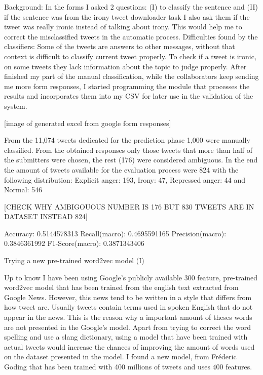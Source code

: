 Background: In the forms I asked 2 questions: (I) to classify the sentence and (II) if the sentence was from the irony tweet downloader task I also ask them if the tweet was really ironic instead of talking about irony. This would help me to correct the misclassified tweets in the automatic process.
Difficulties found by the classifiers:  
Some of the tweets are answers to other messages, without that context is difficult to classify current tweet properly.
To check if a tweet is ironic, on some tweets they lack information about the topic to judge properly.
After finished my part of the manual classification, while the collaborators keep sending me more form responses, I started programming the module that processes the results and incorporates them into my CSV for later use in the validation of the system.

[image of generated excel from google form responses]

From the 11,074 tweets dedicated for the prediction phase 1,000 were manually classified. From the obtained responses only those tweets that more than half of the submitters were chosen, the rest (176) were considered ambiguous.
In the end the amount of tweets available for the evaluation process were 824 with the following distribution:
Explicit anger: 193, Irony: 47, Repressed anger: 44 and Normal: 546

[CHECK WHY AMBIGOUOUS NUMBER IS 176 BUT 830 TWEETS ARE IN DATASET INSTEAD 824]

Accuracy: 0.5144578313
Recall(macro): 0.4695591165
Precision(macro): 0.3846361992
F1-Score(macro): 0.3871343406

Trying a new pre-trained word2vec model (I)

Up to know I have been using Google’s publicly available 300 feature, pre-trained word2vec model that has been trained from the english text extracted from Google News.
However, this news tend to be written in a style that differs from how tweet are. Usually tweets contain terms used in spoken English that do not appear in the news. This is the reason why a important amount of theses words are not presented in the Google’s model. Apart from trying to correct the word spelling and use a slang dictionary, using a model that have been trained with actual tweets would increase the chances of improving the amount of words used on the dataset presented in the model.
I found a new model, from Fréderic Goding\cite{godin2015multimedia} that has been trained with 400 millions of tweets and uses 400 features.

